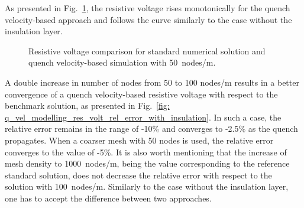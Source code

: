 As presented in Fig.~\ref{fig: q_vel_modelling_res_volt_benchmarking_with_insulation}, the resistive voltage rises monotonically for the quench velocity-based approach and follows the curve similarly to the case without the insulation layer. 

\begin{figure}[H]
\centering
    \caption{Resistive voltage comparison for standard numerical solution and quench velocity-based simulation with 50~nodes/m.}
    \label{fig: q_vel_modelling_res_volt_benchmarking_with_insulation}
\end{figure}

A double increase in number of nodes from 50 to 100 nodes/m results in a better convergence of a quench velocity-based resistive voltage with respect to the benchmark solution, as presented in Fig.~\ref{fig: q_vel_modelling_res_volt_rel_error_with_insulation}. In such a case, the relative error remains in the range of -10\% and converges to -2.5\% as the quench propagates. When a coarser mesh with 50 nodes is used, the relative error converges to the value of -5\%. It is also worth mentioning that the increase of mesh density to 1000~nodes/m, being the value corresponding to the reference standard solution, does not decrease the relative error with respect to the solution with 100~nodes/m. Similarly to the case without the insulation layer, one has to accept the difference between two approaches.

